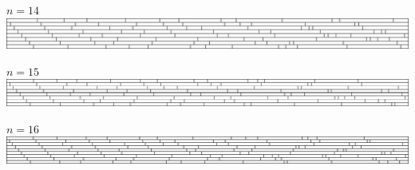 \par\vspace{1em}
$n = 14$\\
\includegraphics[width=\textwidth]{../solutions/14}
\par\vspace{1em}
$n = 15$\\
\includegraphics[width=\textwidth]{../solutions/15}
\par\vspace{1em}
$n = 16$\\
\includegraphics[width=\textwidth]{../solutions/16}
\par\vspace{1em}